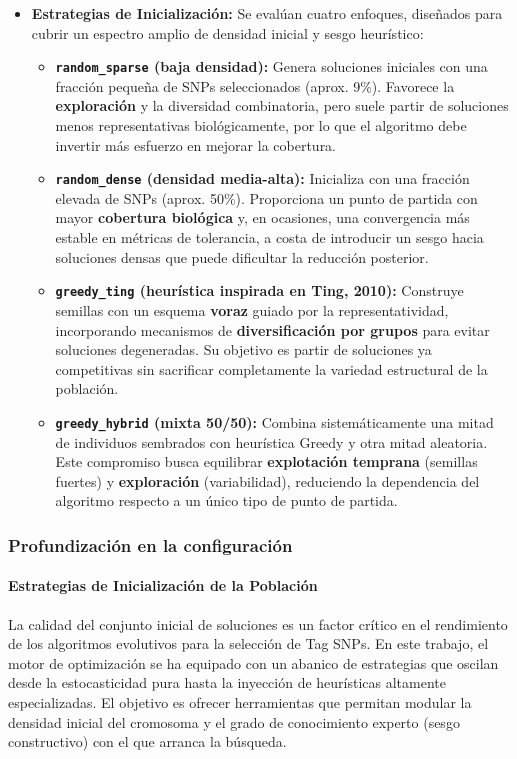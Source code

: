\documentclass[a4paper,10pt]{article}
\begin{document}
\begin{itemize}
    \item \textbf{Estrategias de Inicialización:} Se evalúan cuatro enfoques, diseñados para cubrir un espectro amplio de densidad inicial y sesgo heurístico:
    \begin{itemize}
        \item \textbf{\texttt{random\_sparse} (baja densidad):} Genera soluciones iniciales con una fracción pequeña de SNPs seleccionados (aprox. 9\%). Favorece la \textbf{exploración} y la diversidad combinatoria, pero suele partir de soluciones menos representativas biológicamente, por lo que el algoritmo debe invertir más esfuerzo en mejorar la cobertura.
        \item \textbf{\texttt{random\_dense} (densidad media-alta):} Inicializa con una fracción elevada de SNPs (aprox. 50\%). Proporciona un punto de partida con mayor \textbf{cobertura biológica} y, en ocasiones, una convergencia más estable en métricas de tolerancia, a costa de introducir un sesgo hacia soluciones densas que puede dificultar la reducción posterior.
        \item \textbf{\texttt{greedy\_ting} (heurística inspirada en Ting, 2010):} Construye semillas con un esquema \textbf{voraz} guiado por la representatividad, incorporando mecanismos de \textbf{diversificación por grupos} para evitar soluciones degeneradas. Su objetivo es partir de soluciones ya competitivas sin sacrificar completamente la variedad estructural de la población.
        \item \textbf{\texttt{greedy\_hybrid} (mixta 50/50):} Combina sistemáticamente una mitad de individuos sembrados con heurística Greedy y otra mitad aleatoria. Este compromiso busca equilibrar \textbf{explotación temprana} (semillas fuertes) y \textbf{exploración} (variabilidad), reduciendo la dependencia del algoritmo respecto a un único tipo de punto de partida.
    \end{itemize}
\end{itemize}

\subsubsection{Profundización en la configuración}

\paragraph{Estrategias de Inicialización de la Población}
La calidad del conjunto inicial de soluciones es un factor crítico en el rendimiento de los algoritmos evolutivos para la selección de Tag SNPs. En este trabajo, el motor de optimización se ha equipado con un abanico de estrategias que oscilan desde la estocasticidad pura hasta la inyección de heurísticas altamente especializadas. El objetivo es ofrecer herramientas que permitan modular la densidad inicial del cromosoma y el grado de conocimiento experto (sesgo constructivo) con el que arranca la búsqueda.
\end{document}
